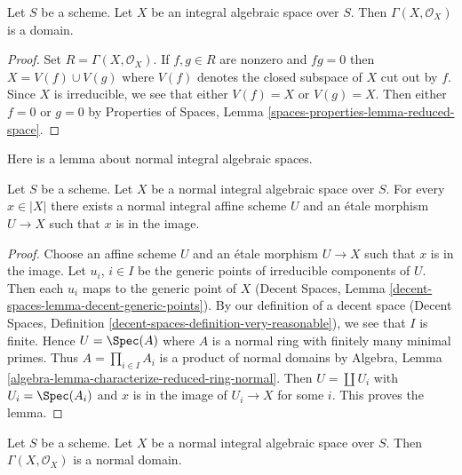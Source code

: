 \begin{lemma}
\label{lemma-integral-sections}
Let $S$ be a scheme. Let $X$ be an integral algebraic space over $S$.
Then $\Gamma(X, \mathcal{O}_X)$ is a domain.
\end{lemma}

\begin{proof}
Set $R = \Gamma(X, \mathcal{O}_X)$. If $f, g \in R$ are nonzero and
$fg = 0$ then $X = V(f) \cup V(g)$ where $V(f)$ denotes the closed subspace
of $X$ cut out by $f$. Since $X$ is irreducible, we see that either
$V(f) = X$ or $V(g) = X$. Then either $f = 0$ or $g = 0$ by
Properties of Spaces, Lemma \ref{spaces-properties-lemma-reduced-space}.
\end{proof}

\noindent
Here is a lemma about normal integral algebraic spaces.

\begin{lemma}
\label{lemma-normal-integral-cover-by-affines}
Let $S$ be a scheme. Let $X$ be a normal integral algebraic space over $S$.
For every $x \in |X|$ there exists a normal integral affine scheme $U$
and an \'etale morphism $U \to X$ such that $x$ is in the image.
\end{lemma}

\begin{proof}
Choose an affine scheme $U$ and an \'etale morphism $U \to X$ such that
$x$ is in the image. Let $u_i$, $i \in I$ be the generic points of irreducible
components of $U$. Then each $u_i$ maps to the generic point of $X$
(Decent Spaces, Lemma \ref{decent-spaces-lemma-decent-generic-points}). By 
our definition of a decent space
(Decent Spaces, Definition \ref{decent-spaces-definition-very-reasonable}),
we see that $I$ is finite. Hence $U = \Spec(A)$ where $A$ is a normal ring
with finitely many minimal primes.
Thus $A = \prod_{i \in I} A_i$ is a product of normal domains by
Algebra, Lemma \ref{algebra-lemma-characterize-reduced-ring-normal}.
Then $U = \coprod U_i$ with $U_i = \Spec(A_i)$ and $x$ is in the image of
$U_i \to X$ for some $i$. This proves the lemma.
\end{proof}

\begin{lemma}
\label{lemma-normal-integral-sections}
Let $S$ be a scheme. Let $X$ be a normal integral algebraic space over $S$.
Then $\Gamma(X, \mathcal{O}_X)$ is a normal domain.
\end{lemma}

